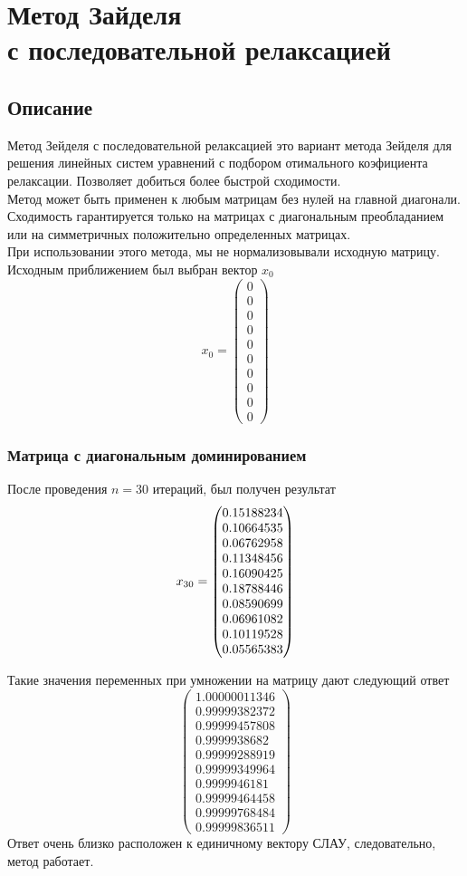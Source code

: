\documentclass[../../report.tex]{subfiles}
\begin{document}
\chapter[Метод Зайделя с последовательной релаксацией]{\texorpdfstring{Метод Зайделя \\ 
с последовательной релаксацией}{Метод Зайделя с последовательной релаксацией}}

\section{Описание}
Метод Зейделя с последовательной релаксацией это вариант метода Зейделя для решения линейных систем 
уравнений с подбором отимального коэфициента релаксации. Позволяет добиться  более быстрой сходимости. \\

Метод может быть применен к любым матрицам без нулей на главной диагонали. Сходимость гарантируется только на
матрицах с диагональным преобладанием или на симметричных положительно определенных матрицах. \\

При использовании этого метода, мы не нормализовывали исходную матрицу. \\

Исходным приближением был выбран вектор $x_0$ 
\[
x_0 = \begin{pmatrix}
    0 \\ 
    0 \\ 
    0 \\ 
    0 \\ 
    0 \\ 
    0 \\ 
    0 \\ 
    0 \\ 
    0 \\ 
    0 
\end{pmatrix}
\]

\subsection{Матрица с диагональным доминированием}
После проведения $n=30$ итераций, был получен результат
\[
x_{30} = \begin{pmatrix} 0.15188234 \\ 0.10664535 \\ 0.06762958 \\ 0.11348456 \\ 0.16090425 \\ 0.18788446 \\ 0.08590699 \\ 0.06961082 \\ 0.10119528 \\ 0.05565383 \end{pmatrix}
\]

Такие значения переменных при умножении на матрицу дают следующий ответ
\[
\begin{pmatrix}
    1.00000011346 \\
    0.99999382372 \\
    0.99999457808 \\
    0.9999938682 \\
    0.99999288919 \\
    0.99999349964 \\
    0.9999946181 \\
    0.99999464458 \\
    0.99999768484 \\
    0.99999836511
\end{pmatrix}
\]
Ответ очень близко расположен к единичному вектору СЛАУ, следовательно, метод работает.
\end{document}
